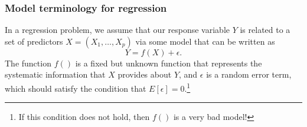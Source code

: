 \documentclass[titlepage,10pt]{scrartcl}
\begin{document}
\subsubsection{Model terminology for regression}

In a regression problem, we assume that our response variable $Y$ is related to a set of predictors $X= (X_1,\ldots,X_p)$ via some model that can be written as
\begin{equation}
Y = f(X)+\epsilon. 
\end{equation}
The function $f()$ is a fixed but unknown function that represents the systematic information that $X$ provides about $Y$, and $\epsilon$ is a random error term, which should satisfy the condition that $E[\epsilon] = 0$.\footnote{If this condition does not hold, then $f()$ is a very bad model!}
\end{document}
